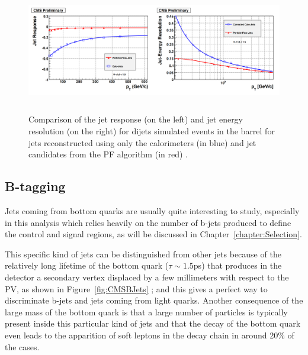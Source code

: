 \documentclass[a4paper, 10pt, openright]{report}
\begin{document}
\begin{figure}[htbp]
\begin{center}
\includegraphics[width=15cm, height=5.5cm]{figs/PFSimu.png}
\caption{Comparison of the jet response (on the left) and jet energy resolution (on the right) for dijets simulated events in the barrel for jets reconstructed using only the calorimeters (in blue) and jet candidates from the \ac{PF} algorithm (in red) \cite{PF2}.}
\label{fig:PFSimu}
\end{center}
\end{figure}

\subsection{B-tagging}  \label{section:BTag}

Jets coming from bottom quarks are usually quite interesting to study, especially in this analysis which relies heavily on the number of b-jets produced to define the control and signal regions, as will be discussed in Chapter~\ref{chapter:Selection}. 

This specific kind of jets can be distinguished from other jets because of the relatively long lifetime of the bottom quark ($\tau \sim 1.5$ps) that produces in the detector a secondary vertex displaced by a few millimeters with respect to the \ac{PV}, as shown in Figure~\ref{fig:CMSBJets} ; and this gives a perfect way to discriminate b-jets and jets coming from light quarks. Another consequence of the large mass of the bottom quark is that a large number of particles is typically present inside this particular kind of jets and that the decay of the bottom quark even leads to the apparition of soft leptons in the decay chain in around 20\% of the cases.
\end{document}
